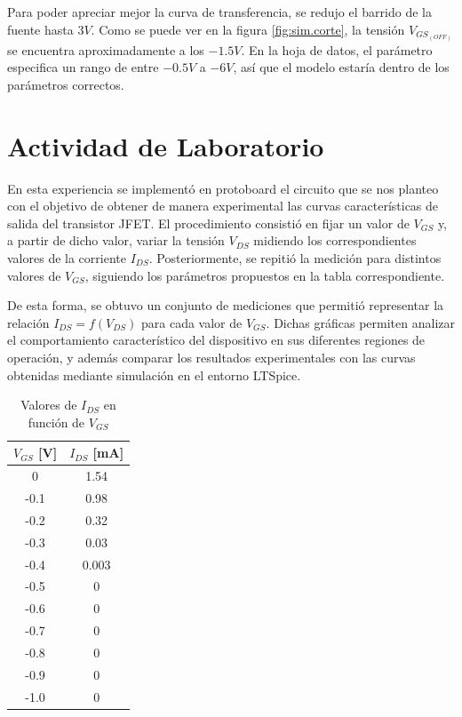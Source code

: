     Para poder apreciar mejor la curva de transferencia, se redujo el barrido de la fuente hasta $3V$. Como se puede ver
    en la figura \ref{fig:sim.corte}, la tensión $V_{GS_{(OFF)}}$ se encuentra aproximadamente a los $-1.5V$. En la hoja
    de datos, el parámetro especifica un rango de entre $-0.5V$ a $-6V$, así que el modelo estaría dentro de los
    parámetros correctos.

  \section{Actividad de Laboratorio}

      

     En esta experiencia se implementó en protoboard el circuito que se nos planteo 
    con el objetivo de obtener de manera experimental las curvas características de salida del transistor JFET. 
    El procedimiento consistió en fijar un valor de $V_{GS}$ y, a partir de dicho valor, variar la tensión 
    $V_{DS}$ midiendo los correspondientes valores de la corriente $I_{DS}$. Posteriormente, se repitió la 
    medición para distintos valores de $V_{GS}$, siguiendo los parámetros propuestos en la tabla correspondiente.
    
    De esta forma, se obtuvo un conjunto de mediciones que permitió representar la relación 
    $I_{DS} = f(V_{DS})$ para cada valor de $V_{GS}$. Dichas gráficas permiten analizar el comportamiento 
    característico del dispositivo en sus diferentes regiones de operación, y además comparar los resultados 
    experimentales con las curvas obtenidas mediante simulación en el entorno LTSpice.

    \begin{table}[H]
        \centering
        \begin{tabular}{|c|c|}
        \hline
        \textbf{$V_{GS}$ [V]} & \textbf{$I_{DS}$ [mA]} \\ \hline
        0     & 1.54  \\ \hline
        -0.1  & 0.98  \\ \hline
        -0.2  & 0.32  \\ \hline
        -0.3  & 0.03  \\ \hline
        -0.4  & 0.003 \\ \hline
        -0.5  & 0     \\ \hline
        -0.6  & 0     \\ \hline
        -0.7  & 0     \\ \hline
        -0.8  & 0     \\ \hline
        -0.9  & 0     \\ \hline
        -1.0  & 0     \\ \hline
      \end{tabular}
      \caption{Valores de $I_{DS}$ en función de $V_{GS}$}
      \label{tab:ids-vgs}
    \end{table}


